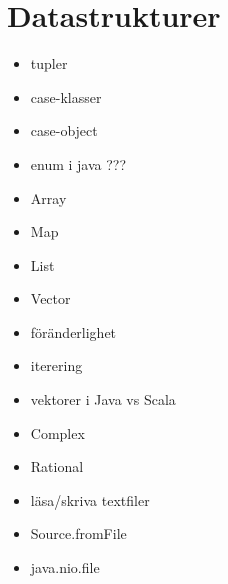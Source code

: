 \chapter{Datastrukturer}\label{chapter:W04}
\begin{itemize}[nosep]
\item tupler
\item case-klasser
\item case-object
\item enum i java ???
\item Array
\item Map
\item List
\item Vector
\item föränderlighet
\item iterering
\item vektorer i Java vs Scala
\item Complex
\item Rational
\item läsa/skriva textfiler
\item Source.fromFile
\item java.nio.file
\end{itemize}